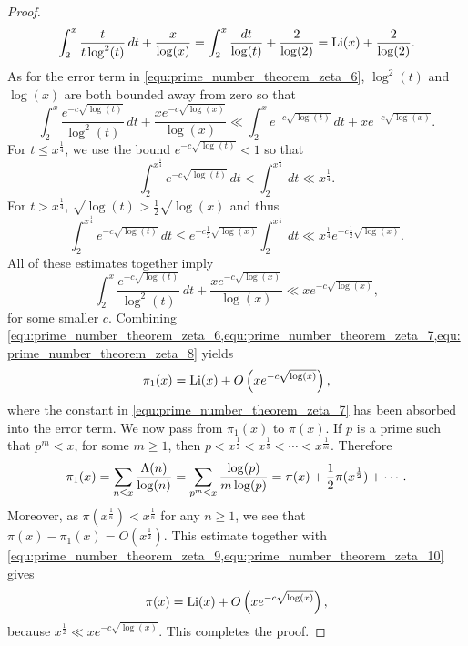 \begin{proof}
\begin{equation}
        \int_{2}^{x}\frac{t}{t\log^{2}(t)}\,dt+\frac{x}{\log(x)} = \int_{2}^{x}\frac{dt}{\log(t)}+\frac{2}{\log(2)} = \operatorname{\mathrm{Li}}(x)+\frac{2}{\log(2)}.
      \end{equation}
      As for the error term in \cref{equ:prime_number_theorem_zeta_6}, $\log^{2}(t)$ and $\log(x)$ are both bounded away from zero so that
      \[
        \int_{2}^{x}\frac{e^{-c\sqrt{\log(t)}}}{\log^{2}(t)}\,dt+\frac{xe^{-c\sqrt{\log(x)}}}{\log(x)} \ll \int_{2}^{x}e^{-c\sqrt{\log(t)}}\,dt+xe^{-c\sqrt{\log(x)}}.
      \]
      For $t \le x^{\frac{1}{4}}$, we use the bound $e^{-c\sqrt{\log(t)}} < 1$ so that
      \[
        \int_{2}^{x^{\frac{1}{4}}}e^{-c\sqrt{\log(t)}}\,dt < \int_{2}^{x^{\frac{1}{4}}}\,dt \ll x^{\frac{1}{4}}.
      \]
      For $t > x^{\frac{1}{4}}$, $\sqrt{\log(t)} > \frac{1}{2}\sqrt{\log(x)}$ and thus
      \[
        \int_{2}^{x^{\frac{1}{4}}}e^{-c\sqrt{\log(t)}}\,dt \le e^{-c\frac{1}{2}\sqrt{\log(x)}}\int_{2}^{x^{\frac{1}{4}}}\,dt \ll x^{\frac{1}{4}}e^{-c\frac{1}{2}\sqrt{\log(x)}}. 
      \]
      All of these estimates together imply
      \begin{equation}\label{equ:prime_number_theorem_zeta_8}
        \int_{2}^{x}\frac{e^{-c\sqrt{\log(t)}}}{\log^{2}(t)}\,dt+\frac{xe^{-c\sqrt{\log(x)}}}{\log(x)} \ll xe^{-c\sqrt{\log(x)}},
      \end{equation}
      for some smaller $c$. Combining \cref{equ:prime_number_theorem_zeta_6,equ:prime_number_theorem_zeta_7,equ:prime_number_theorem_zeta_8} yields
      \begin{equation}\label{equ:prime_number_theorem_zeta_9}
        \pi_{1}(x) = \operatorname{\mathrm{Li}}(x)+O\left(xe^{-c\sqrt{\log(x)}}\right),
      \end{equation}
      where the constant in \cref{equ:prime_number_theorem_zeta_7} has been absorbed into the error term. We now pass from $\pi_{1}(x)$ to $\pi(x)$. If $p$ is a prime such that $p^{m} < x$, for some $m \ge 1$, then $p < x^{\frac{1}{2}} < x^{\frac{1}{3}} < \cdots < x^{\frac{1}{m}}$. Therefore
      \begin{equation}\label{equ:prime_number_theorem_zeta_10}
        \pi_{1}(x) = \sum_{n \le x}\frac{\Lambda(n)}{\log(n)} = \sum_{p^{m} \le x}\frac{\log(p)}{m\log(p)} = \pi(x)+\frac{1}{2}\pi(x^{\frac{1}{2}})+\cdots.
      \end{equation}
      Moreover, as $\pi(x^{\frac{1}{n}}) < x^{\frac{1}{n}}$ for any $n \ge 1$, we see that $\pi(x)-\pi_{1}(x) = O(x^{\frac{1}{2}})$. This estimate together with \cref{equ:prime_number_theorem_zeta_9,equ:prime_number_theorem_zeta_10} gives
      \[
        \pi(x) = \operatorname{\mathrm{Li}}(x)+O\left(xe^{-c\sqrt{\log(x)}}\right),
      \]
      because $x^{\frac{1}{2}} \ll xe^{-c\sqrt{\log(x)}}$. This completes the proof.
    \end{proof}

